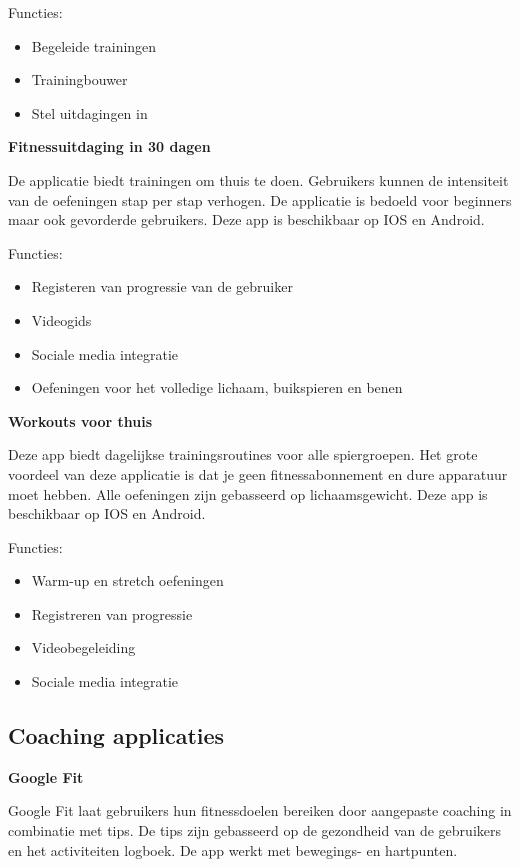 Functies:
\begin{itemize}
\item Begeleide trainingen
\item Trainingbouwer
\item Stel uitdagingen in
\end{itemize}

\textbf{Fitnessuitdaging in 30 dagen}

De applicatie biedt trainingen om thuis te doen. Gebruikers kunnen de intensiteit van de oefeningen stap per stap verhogen. De applicatie is bedoeld voor beginners maar ook gevorderde gebruikers.
Deze app is beschikbaar op IOS en Android.

Functies:
\begin{itemize}
\item Registeren van progressie van de gebruiker
\item Videogids
\item Sociale media integratie
\item Oefeningen voor het volledige lichaam, buikspieren en benen 
\end{itemize}

\textbf{Workouts voor thuis}

Deze app biedt dagelijkse trainingsroutines voor alle spiergroepen. Het grote voordeel van deze applicatie is dat je geen fitnessabonnement en dure apparatuur moet hebben. Alle oefeningen zijn gebasseerd op lichaamsgewicht.
Deze app is beschikbaar op IOS en Android.

Functies:
\begin{itemize}
\item Warm-up en stretch oefeningen
\item Registreren van progressie
\item Videobegeleiding
\item Sociale media integratie
\end{itemize}

\subsection{Coaching applicaties}
\label{sec:Coachingapplicaties}

\textbf{Google Fit}

Google Fit laat gebruikers hun fitnessdoelen bereiken door aangepaste coaching in combinatie met tips. De tips zijn gebasseerd op de gezondheid van de gebruikers en het activiteiten logboek. De app werkt met bewegings- en hartpunten. 

